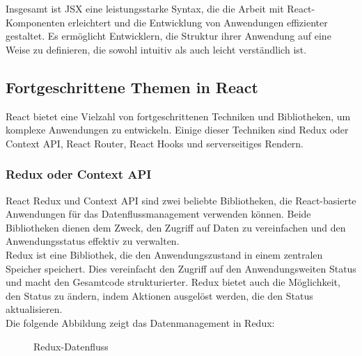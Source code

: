 Insgesamt ist JSX eine leistungsstarke Syntax, die die Arbeit mit React-Komponenten erleichtert und die Entwicklung von Anwendungen effizienter gestaltet. Es ermöglicht Entwicklern, die Struktur ihrer Anwendung auf eine Weise zu definieren, die sowohl intuitiv als auch leicht verständlich ist.	

\subsection{Fortgeschrittene Themen in React}
React bietet eine Vielzahl von fortgeschrittenen Techniken und Bibliotheken, um komplexe Anwendungen zu entwickeln. Einige dieser Techniken sind Redux oder Context API, React Router, React Hooks und serverseitiges Rendern.
\subsubsection{Redux oder Context API}
React Redux und Context API sind zwei beliebte Bibliotheken, die React-basierte Anwendungen für das Datenflussmanagement verwenden können. Beide Bibliotheken dienen dem Zweck, den Zugriff auf Daten zu vereinfachen und den Anwendungsstatus effektiv zu verwalten.\\
Redux ist eine Bibliothek, die den Anwendungszustand in einem zentralen Speicher speichert. Dies vereinfacht den Zugriff auf den Anwendungsweiten Status und macht den Gesamtcode strukturierter. Redux bietet auch die Möglichkeit, den Status zu ändern, indem Aktionen ausgelöst werden, die den Status aktualisieren.\\\cite{scalablepath}
Die folgende Abbildung zeigt das Datenmanagement in Redux:
\begin{figure}[htbp]
	\centering
	\caption{Redux-Datenfluss}
\end{figure}\\
